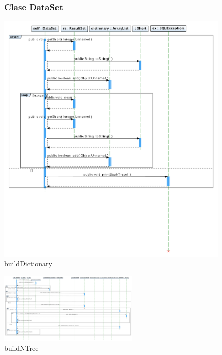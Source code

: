 \begin{figure}
\subsubsection{Clase DataSet}
\centering
\includegraphics[width=1\textwidth]{imgsSecuencia/DataSet/buildDictionary.png}
\caption{buildDictionary}
\end{figure}
\newpage
\begin{figure}
\centering
\includegraphics[angle=90, width=0.6\textwidth]{imgsSecuencia/DataSet/buildNTree.png}
\caption{buildNTree}
\end{figure}
\newpage
